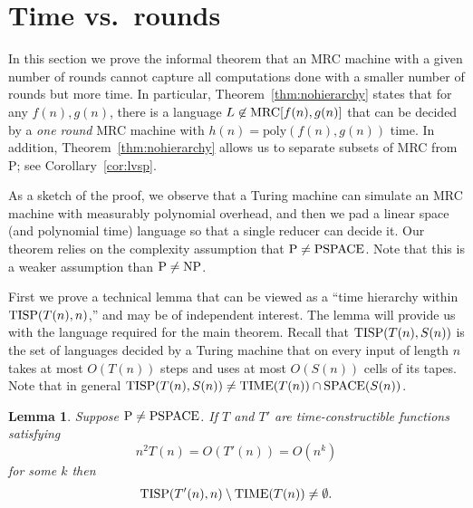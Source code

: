 \documentclass[11pt]{article}
\newtheorem{lemma}[thm]{Lemma}
\theoremstyle{definition}
\theoremstyle{remark}
\newcommand{\mrc}{\textup{MRC}}
\newcommand{\SPACE}{\textup{SPACE}}
\newcommand{\TIME}{\textup{TIME}}
\newcommand{\TISP}{\textup{TISP}}
\renewcommand{\P}{\textup{P}}
\newcommand{\NP}{\textup{NP}}
\newcommand{\PSPACE}{\textup{PSPACE}}
\begin{document}
\section{Time vs.\ rounds}\label{sec:nohierarchy}

In this section we prove the informal theorem that an MRC machine with a given
number of rounds cannot capture all computations done with a smaller number of
rounds but more time. In particular, Theorem~\ref{thm:nohierarchy} states that
for any $f(n), g(n)$, there is a language $L \not \in \mrc[f(n), g(n)]$ that
can be decided by a \emph{one round} MRC machine with $h(n) = \text{poly}(f(n),
g(n))$ time. In addition, Theorem~\ref{thm:nohierarchy} allows us to separate
subsets of MRC from P; see Corollary~\ref{cor:lvsp}.

As a sketch of the proof, we observe that a Turing machine can simulate an MRC
machine with measurably polynomial overhead, and then we pad a linear space
(and polynomial time) language so that a single reducer can decide it.  Our
theorem relies on the complexity assumption that $\P\ne\PSPACE$. Note that this
is a weaker assumption than $\P\ne\NP$. 

First we prove a technical lemma that can be viewed as a ``time hierarchy
within $\TISP(T(n), n)$,'' and may be of independent interest. The lemma will
provide us with the language required for the main theorem. Recall that
$\TISP(T(n),S(n))$ is the set of languages decided by a Turing machine that on
every input of length $n$ takes at most $O(T(n))$ steps and uses at most
$O(S(n))$ cells of its tapes. Note that in general $\TISP(T(n), S(n)) \neq
\TIME(T(n)) \cap \SPACE(S(n))$.

\begin{lemma}
Suppose $\P\neq\PSPACE$.  If $T$ and $T'$ are time-constructible functions
satisfying $$n^2 T(n) = O(T'(n)) = O(n^k)$$ for some $k$ then $$\TISP(T'(n),n)
\setminus \TIME(T(n)) \ne \emptyset.$$ \end{lemma}
\end{document}
